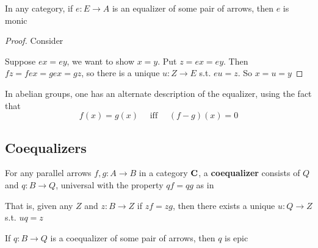 \documentclass[11pt]{article}
\begin{document}
\begin{proposition}[]
In any category, if \(e:E\to A\) is an equalizer of some pair of arrows, then
\(e\) is monic
\end{proposition}

\begin{proof}
Consider
\begin{center}\end{center}
Suppose \(ex=ey\), we want to show \(x=y\). Put \(z=ex=ey\). Then
\(fz=fex=gex=gz\), so there is a unique \(u:Z\to E\) s.t. \(eu=z\). So \(x=u=y\)
\end{proof}

\begin{examplle}[]
In abelian groups, one has an alternate description of the equalizer, using
the fact that
\begin{equation*}
f(x)=g(x) \quad\text{ iff }\quad (f-g)(x)=0
\end{equation*}
\end{examplle}


\subsection{Coequalizers}
\label{sec:org951afc2}
\begin{definition}[]
For any parallel arrows \(f,g:A\to B\) in a category \(\operatorname{\textbf{C}}\), a \textbf{coequalizer}
consists of \(Q\) and \(q:B\to Q\), universal with the property \(qf=qg\) as
in
\begin{center}\end{center}
That is, given any \(Z\) and \(z:B\to Z\) if \(zf=zg\), then there exists a
unique \(u:Q\to Z\) s.t. \(uq=z\)
\end{definition}

\begin{proposition}[]
If \(q:B\to Q\) is a coequalizer of some pair of arrows, then \(q\) is epic
\end{proposition}
\end{document}
